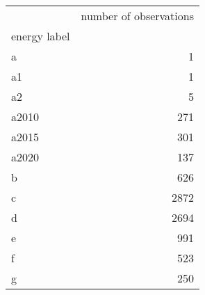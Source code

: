 \begin{tabular}{lr}
 & number of observations \\
energy label &  \\
a & 1 \\
a1 & 1 \\
a2 & 5 \\
a2010 & 271 \\
a2015 & 301 \\
a2020 & 137 \\
b & 626 \\
c & 2872 \\
d & 2694 \\
e & 991 \\
f & 523 \\
g & 250 \\
\end{tabular}
